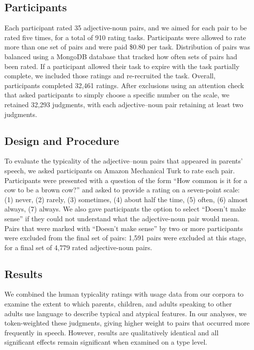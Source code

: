\documentclass{ucetd}
\begin{document}
\hypertarget{participants}{%
\subsection{Participants}\label{participants}}

Each participant rated 35 adjective-noun pairs, and we aimed for each
pair to be rated five times, for a total of 910 rating tasks.
Participants were allowed to rate more than one set of pairs and were
paid \$0.80 per task. Distribution of pairs was balanced using a MongoDB
database that tracked how often sets of pairs had been rated. If a
participant allowed their task to expire with the task partially
complete, we included those ratings and re-recruited the task. Overall,
participants completed 32,461 ratings. After exclusions using an
attention check that asked participants to simply choose a specific
number on the scale, we retained 32,293 judgments, with each
adjective--noun pair retaining at least two judgments.

\hypertarget{design-and-procedure}{%
\subsection{Design and Procedure}\label{design-and-procedure}}

To evaluate the typicality of the adjective--noun pairs that appeared in
parents' speech, we asked participants on Amazon Mechanical Turk to rate
each pair. Participants were presented with a question of the form ``How
common is it for a cow to be a brown cow?'' and asked to provide a
rating on a seven-point scale: (1) never, (2) rarely, (3) sometimes, (4)
about half the time, (5) often, (6) almost always, (7) always. We also
gave participants the option to select ``Doesn't make sense'' if they
could not understand what the adjective-noun pair would mean. Pairs that
were marked with ``Doesn't make sense'' by two or more participants were
excluded from the final set of pairs: 1,591 pairs were excluded at this
stage, for a final set of 4,779 rated adjective-noun pairs.

\hypertarget{results}{%
\subsection{Results}\label{results}}

We combined the human typicality ratings with usage data from our
corpora to examine the extent to which parents, children, and adults
speaking to other adults use language to describe typical and atypical
features. In our analyses, we token-weighted these judgments, giving
higher weight to pairs that occurred more frequently in speech. However,
results are qualitatively identical and all significant effects remain
significant when examined on a type level.
\end{document}
